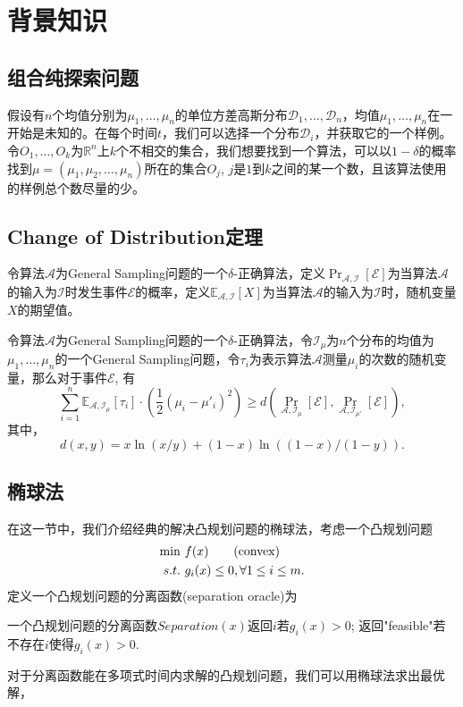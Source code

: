 \chapter{背景知识}
\section{组合纯探索问题}
\begin{definition}
假设有$n$个均值分别为$\mu_1, \dots, \mu_n$的单位方差高斯分布$\mathcal{D}_1, \dots, \mathcal{D}_n$，均值$\mu_1,\dots,\mu_n$在一开始是未知的。在每个时间$t$，我们可以选择一个分布$\mathcal{D}_i$，并获取它的一个样例。令$O_1,\dots, O_k$为$\mathbb{R}^n$上$k$个不相交的集合，我们想要找到一个算法，可以以$1-\delta$的概率找到$\mu = (\mu_1, \mu_2,\dots, \mu_n)$所在的集合$O_j$, $j$是$1$到$k$之间的某一个数，且该算法使用的样例总个数尽量的少。
\end{definition}

\section{Change of Distribution定理}

令算法$\mathcal{A}$为General Sampling问题的一个$\delta$-正确算法，定义$\Pr_{\mathcal{A}, \mathcal{I}}[\mathcal{E}]$为当算法$\mathcal{A}$的输入为$\mathcal{I}$时发生事件$\mathcal{E}$的概率，定义$\mathbb{E}_{\mathcal{A}, \mathcal{I}}[X]$为当算法$\mathcal{A}$的输入为$\mathcal{I}$时，随机变量$X$的期望值。
\begin{theorem}\label{ChangeDistr}
令算法$\mathcal{A}$为General Sampling问题的一个$\delta$-正确算法，令$\mathcal{I}_\mu$为$n$个分布的均值为$\mu_1,\dots, \mu_n$的一个General Sampling问题，令$\tau_i$为表示算法$\mathcal{A}$测量$\mu_i$的次数的随机变量，那么对于事件$\mathcal{E}$, 有
\[
\sum_{i=1}^n \mathbb{E}_{\mathcal{A}, \mathcal{I}_\mu}[\tau_i]\cdot (\frac{1}{2}(\mu_i - \mu'_i)^2) \ge d\left(\Pr_{\mathcal{A}, \mathcal{I}_\mu}[\mathcal{E}], \Pr_{\mathcal{A}, \mathcal{I}_{\mu'}}[\mathcal{E}]\right),
\]
其中，
\[
d(x,y) = x \ln (x/y)+ (1-x)\ln\left((1-x)/(1-y)\right).
\]
\end{theorem}
\section{椭球法}
在这一节中，我们介绍经典的解决凸规划问题的椭球法，考虑一个凸规划问题
\begin{align}
  \min & \ f(x) \tag{convex}\\
  s.t. & \ g_i(x) \le 0,  \forall 1\le i\le m. \notag
\end{align}
定义一个凸规划问题的分离函数(separation oracle)为
\begin{definition}\label{separation}
一个凸规划问题的分离函数$Separation(x)$返回$i$若$g_i(x)>0$; 返回"feasible"若不存在$i$使得$g_i(x)>0$.
\end{definition}
对于分离函数能在多项式时间内求解的凸规划问题，我们可以用椭球法求出最优解，

